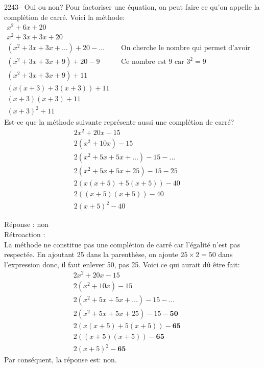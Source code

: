 \documentclass[letterpaper, 12pt]{article}
\begin{document}
2243-- Oui ou non? Pour factoriser une \'equation, on peut faire ce qu'on appelle la compl\'etion de carr\'e. Voici la m\'ethode:
\begin{eqnarray*}
x^{2}+6x+20 & & \\
 x^{2}+3x+3x+20 & & \\
(x^{2}+3x+3x+\ldots)+20-\ldots & & \textrm{On cherche le nombre qui permet d'avoir un trin\^ome carr\'e parfait.}\\
(x^{2}+3x+3x+9)+20-9& & \textrm{Ce nombre est 9 car $3^{2}=9$} \\
(x^{2}+3x+3x+9)+11 & & \\
(x(x+3)+3(x+3))+11 & & \\
(x+3)(x+3)+11 & & \\
(x+3)^{2}+11 & &
\end{eqnarray*}
Est-ce que la m\'ethode suivante repr\'esente aussi une compl\'etion de carr\'e?
\begin{eqnarray*}
2x^{2}+20x-15 & & \\
 2(x^{2}+10x)-15 & & \\
 2(x^{2}+5x+5x+\ldots)-15-\ldots & & \\
 2(x^{2}+5x+5x+25)-15-25 & & \\
 2(x(x+5)+5(x+5))-40 & & \\
 2((x+5)(x+5))-40 & & \\
 2(x+5)^{2}-40 & &
\end{eqnarray*}

R\'eponse : non\\

R\'etroaction :\\
La m\'ethode ne constitue pas une compl\'etion de carr\'e car l'\'egalit\'e n'est pas respect\'ee. En ajoutant 25 dans la parenth\`ese, on ajoute $25\times2=50$ dans l'expression donc, il faut enlever 50, pas 25. Voici ce qui aurait d\^u \^etre fait:
\begin{eqnarray*}
2x^{2}+20x-15 & & \\
 2(x^{2}+10x)-15 & & \\
 2(x^{2}+5x+5x+\ldots)-15-\ldots & & \\
 2(x^{2}+5x+5x+25)-15-\textbf{50} & & \\
 2(x(x+5)+5(x+5))-\textbf{65} & & \\
 2((x+5)(x+5))-\textbf{65} & & \\
 2(x+5)^{2}-\textbf{65} & &
\end{eqnarray*}
Par cons\'equent, la r\'eponse est: non.\\
\end{document}

